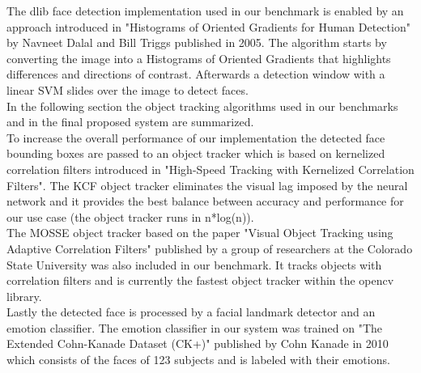 The dlib face detection implementation used in our benchmark is enabled by an approach introduced in "Histograms of Oriented Gradients for Human Detection"\cite{HoGpaper} by Navneet Dalal and Bill Triggs published in 2005. The algorithm starts by converting the image into a Histograms of Oriented Gradients that highlights differences and directions of contrast. Afterwards a detection window with a linear SVM slides over the image to detect faces.\\
In the following section the object tracking algorithms used in our benchmarks and in the final proposed system are summarized.\\ 
To increase the overall performance of our implementation the detected face bounding boxes are passed to an object tracker which is based on kernelized correlation filters introduced in "High-Speed Tracking with Kernelized Correlation Filters"\cite{kcf}. The KCF object tracker eliminates the visual lag imposed by the neural network and it provides the best balance between accuracy and performance for our use case (the object tracker runs in n*log(n)).\\
The MOSSE object tracker based on the paper "Visual Object Tracking using Adaptive Correlation Filters"\cite{Mosse} published by a group of researchers at the Colorado State University was also included in our benchmark. It tracks objects with correlation filters and is currently the fastest object tracker within the \gls{opencv} library.\\
Lastly the detected face is processed by a facial landmark detector and an emotion classifier. The emotion classifier in our system was trained on "The Extended Cohn-Kanade Dataset (CK+)"\cite{ckplus} published by Cohn Kanade in 2010 which consists of the faces of 123 subjects and is labeled with their emotions. 
